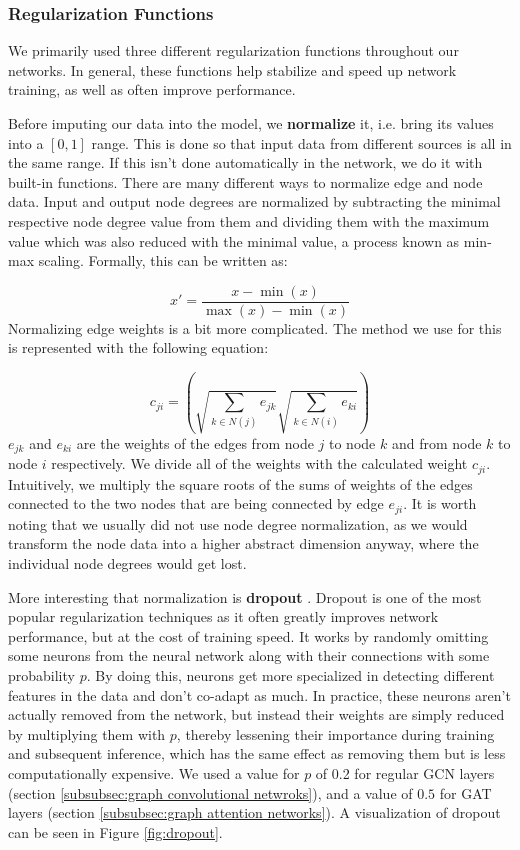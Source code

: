 \documentclass[times, utf8, diplomski, english]{fer_eng}
\begin{document}
\subsubsection{Regularization Functions}
\label{subsubsec:regularization functions}

We primarily used three different regularization functions throughout our networks. In general, these functions help stabilize and speed up network training, as well as often improve performance.

Before imputing our data into the model, we \textbf{normalize} it, i.e. bring its values into a $[0,1]$ range. This is done so that input data from different sources is all in the same range. If this isn't done automatically in the network, we do it with built-in functions. There are many different ways to normalize edge and node data. Input and output node degrees are normalized by subtracting the minimal respective node degree value from them and dividing them with the maximum value which was also reduced with the minimal value, a process known as min-max scaling. Formally, this can be written as:

\[ x' = \frac{x - \min(x)}{\max(x) - \min(x)} \]
Normalizing edge weights is a bit more complicated. The method we use for this is represented with the following equation:

\[ c_{ji} = \left( \sqrt{\sum_{k \in N(j)} e_{jk} } \sqrt{\sum_{k \in N(i)} e_{ki} } \right) \]
$e_{jk}$ and $e_{ki}$ are the weights of the edges from node $j$ to node $k$ and from node $k$ to node $i$ respectively. We divide all of the weights with the calculated weight $c_{ji}$. Intuitively, we multiply the square roots of the sums of weights of the edges connected to the two nodes that are being connected by edge $e_{ji}$. It is worth noting that we usually did not use node degree normalization, as we would transform the node data into a higher abstract dimension anyway, where the individual node degrees would get lost.

More interesting that normalization is \textbf{dropout} \cite{dropout} \cite{dropout2}. Dropout is one of the most popular regularization techniques as it often greatly improves network performance, but at the cost of training speed. It works by randomly omitting some neurons from the neural network along with their connections with some probability $p$. By doing this, neurons get more specialized in detecting different features in the data and don't co-adapt as much. In practice, these neurons aren't actually removed from the network, but instead their weights are simply reduced by multiplying them with $p$, thereby lessening their importance during training and subsequent inference, which has the same effect as removing them but is less computationally expensive. We used a value for $p$ of 0.2 for regular GCN layers (section \ref{subsubsec:graph convolutional netwroks}), and a value of $0.5$ for GAT layers (section \ref{subsubsec:graph attention networks}). A visualization of dropout can be seen in Figure \ref{fig:dropout}.
\end{document}

